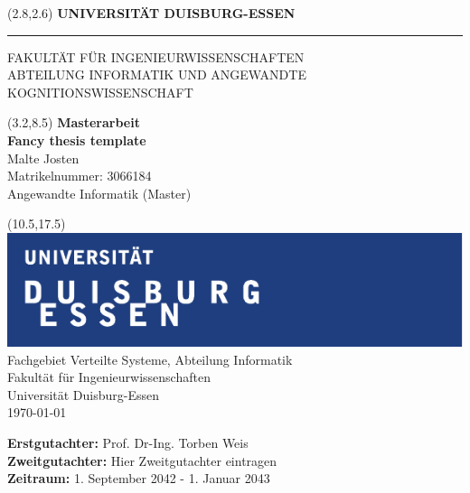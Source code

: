 \begin{titlepage}
\vspace*{-1cm}
\newlength{\links}
\setlength{\links}{0.9cm}
\setlength{\TPHorizModule}{1cm}
\setlength{\TPVertModule}{1cm}
\textblockorigin{0pt}{0pt}

\sffamily
\LARGE

\begin{textblock}{16.5}(2.8,2.6)
 \hspace*{-0.25cm} \textbf{UNIVERSITÄT DUISBURG-ESSEN} \\
 \hspace*{-1.15cm} \rule{5mm}{5mm} \hspace*{0.05cm} FAKULTÄT FÜR INGENIEURWISSENSCHAFTEN\\
 \large{}ABTEILUNG INFORMATIK UND ANGEWANDTE KOGNITIONSWISSENSCHAFT\\
\end{textblock}


\begin{textblock}{14.5}(3.2,8.5)
  \large
{ \textbf{Masterarbeit}} \\[1cm]
{\LARGE \Large\textbf{Fancy thesis template}} \\[1.3cm]
Malte Josten\\
Matrikelnummer: 3066184\\
Angewandte Informatik (Master)
\end{textblock}



\begin{textblock}{10}(10.5,17.5)
\includegraphics[scale=1.0]{images/unilogo.pdf}\\
\normalsize
\raggedleft
Fachgebiet Verteilte Systeme, Abteilung Informatik \\
Fakultät für Ingenieurwissenschaften \\
Universität Duisburg-Essen \\[2ex]

\today\\[15ex]
\raggedright
{\textbf{Erstgutachter:}} Prof. Dr-Ing. Torben Weis \\
{\textbf{Zweitgutachter:}} Hier Zweitgutachter eintragen \\
{\textbf{Zeitraum:}} 1. September 2042 - 1. Januar 2043 \\
\end{textblock}

\end{titlepage}
